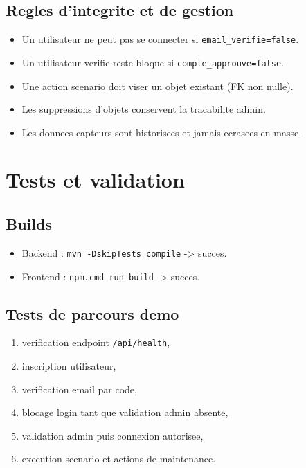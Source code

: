 \documentclass[11pt,a4paper]{article}
\begin{document}
\subsection{Regles d'integrite et de gestion}
\begin{itemize}
  \item Un utilisateur ne peut pas se connecter si \texttt{email\_verifie=false}.
  \item Un utilisateur verifie reste bloque si \texttt{compte\_approuve=false}.
  \item Une action scenario doit viser un objet existant (FK non nulle).
  \item Les suppressions d'objets conservent la tracabilite admin.
  \item Les donnees capteurs sont historisees et jamais ecrasees en masse.
\end{itemize}

\section{Tests et validation}

\subsection{Builds}
\begin{itemize}
  \item Backend : \texttt{mvn -DskipTests compile} -> succes.
  \item Frontend : \texttt{npm.cmd run build} -> succes.
\end{itemize}

\subsection{Tests de parcours demo}
\begin{enumerate}
  \item verification endpoint \texttt{/api/health},
  \item inscription utilisateur,
  \item verification email par code,
  \item blocage login tant que validation admin absente,
  \item validation admin puis connexion autorisee,
  \item execution scenario et actions de maintenance.
\end{enumerate}
\end{document}

